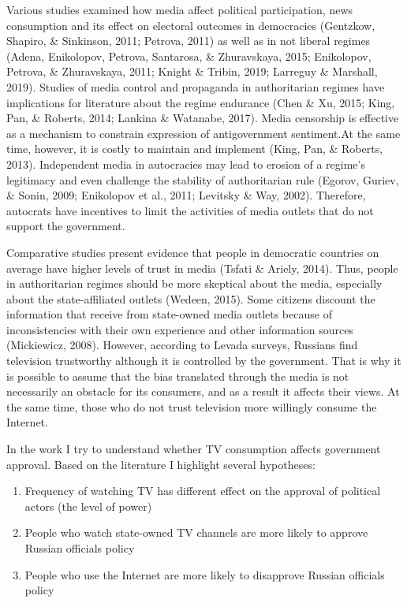 \documentclass[
  english,
  man]{apa6}
\begin{document}
Various studies examined how media affect political participation, news consumption and its effect on electoral outcomes in democracies (Gentzkow, Shapiro, \& Sinkinson, 2011; Petrova, 2011) as well as in not liberal regimes (Adena, Enikolopov, Petrova, Santarosa, \& Zhuravskaya, 2015; Enikolopov, Petrova, \& Zhuravskaya, 2011; Knight \& Tribin, 2019; Larreguy \& Marshall, 2019). Studies of media control and propaganda in authoritarian regimes have implications for literature about the regime endurance (Chen \& Xu, 2015; King, Pan, \& Roberts, 2014; Lankina \& Watanabe, 2017). Media censorship is effective as a mechanism to constrain expression of antigovernment sentiment.At the same time, however, it is costly to maintain and implement (King, Pan, \& Roberts, 2013). Independent media in autocracies may lead to erosion of a regime's legitimacy and even challenge the stability of authoritarian rule (Egorov, Guriev, \& Sonin, 2009; Enikolopov et al., 2011; Levitsky \& Way, 2002). Therefore, autocrats have incentives to limit the activities of media outlets that do not support the government.

Comparative studies present evidence that people in democratic countries on average have higher levels of trust in media (Tsfati \& Ariely, 2014). Thus, people in authoritarian regimes should be more skeptical about the media, especially about the state-affiliated outlets (Wedeen, 2015). Some citizens discount the information that receive from state-owned media outlets because of inconsistencies with their own experience and other information sources (Mickiewicz, 2008). However, according to Levada surveys, Russians find television trustworthy although it is controlled by the government. That is why it is possible to assume that the bias translated through the media is not necessarily an obstacle for its consumers, and as a result it affects their views. At the same time, those who do not trust television more willingly consume the Internet.

In the work I try to understand whether TV consumption affects government approval. Based on the literature I highlight several hypotheses:

\begin{enumerate}
\def\labelenumi{\arabic{enumi}.}
\item
  Frequency of watching TV has different effect on the approval of political actors (the level of power)
\item
  People who watch state-owned TV channels are more likely to approve Russian officials policy
\item
  People who use the Internet are more likely to disapprove Russian officials policy
\end{enumerate}
\end{document}
